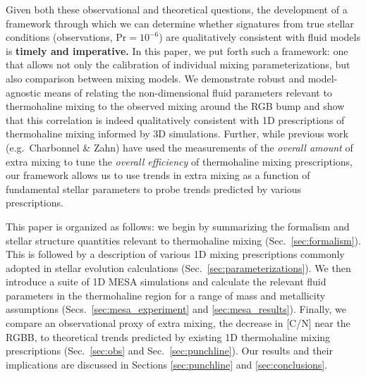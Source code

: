 Given both these observational and theoretical questions, the development of a framework through which we can determine whether signatures from true stellar conditions (observations, $\mathrm{Pr} = 10^{-6}$) are qualitatively consistent with fluid models is \textbf{timely and imperative.} 
In this paper, we put forth such a framework: one that allows not only the calibration of individual mixing parameterizations, but also comparison between mixing models. We demonstrate \a robust and model-agnostic means of relating the non-dimensional fluid parameters relevant to thermohaline mixing to the observed mixing around the RGB bump and show that this correlation is indeed qualitatively consistent with 1D prescriptions of thermohaline mixing informed by 3D simulations. Further, while previous work (e.g.~Charbonnel \& Zahn) have used the measurements of the \textit{overall amount} of extra mixing to tune the \textit{overall efficiency} of thermohaline mixing prescriptions, our framework allows us to use trends in extra mixing as a function of fundamental stellar parameters to probe trends predicted by various prescriptions.

This paper is organized as follows: we begin by summarizing the formalism and stellar structure quantities relevant to thermohaline mixing (Sec.~\ref{sec:formalism}). This is followed by a description of various 1D mixing prescriptions commonly adopted in stellar evolution calculations (Sec.~\ref{sec:parameterizations}). We then introduce a suite of 1D MESA simulations and calculate the relevant fluid parameters in the thermohaline region for a range of mass and metallicity assumptions (Secs.~\ref{sec:mesa_experiment} and \ref{sec:mesa_results}). Finally, we compare an observational proxy of extra mixing, the decrease in [C/N] near the RGBB, to theoretical trends predicted by existing 1D thermohaline mixing prescriptions (Sec.~\ref{sec:obs} and Sec.~\ref{sec:punchline}). Our results and their implications are discussed in Sections \ref{sec:punchline} and \ref{sec:conclusions}. 